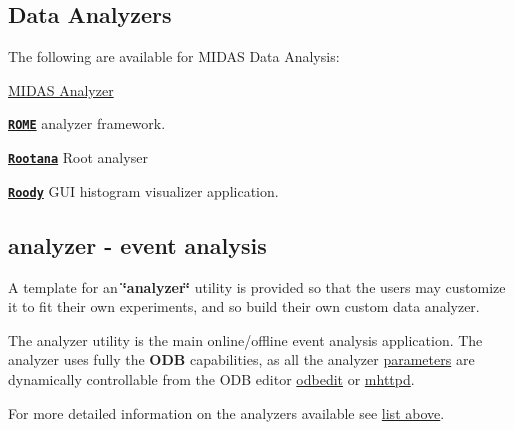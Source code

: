 \par
  \par


\label{DataAnalysis_idx_analyzers}
\hypertarget{DataAnalysis_idx_analyzers}{}
 \label{DataAnalysis_idx_analyzer_documentation_ROME}
\hypertarget{DataAnalysis_idx_analyzer_documentation_ROME}{}
 \label{DataAnalysis_idx_analyzer_documentation_Rootana}
\hypertarget{DataAnalysis_idx_analyzer_documentation_Rootana}{}
 \label{DataAnalysis_idx_analyzer_documentation_Roody}
\hypertarget{DataAnalysis_idx_analyzer_documentation_Roody}{}
\hypertarget{DataAnalysis_DA_Data_analyzers}{}\subsection{Data Analyzers}\label{DataAnalysis_DA_Data_analyzers}
The following are available for MIDAS Data Analysis: 
\begin{DoxyItemize}
\item \hyperlink{DataAnalysis_DA_Midas_Analyzer}{MIDAS Analyzer} 
\item {\bfseries \href{http://midas.psi.ch/rome}{\tt ROME}} analyzer framework. 
\item {\bfseries \href{http://ladd00.triumf.ca/%7Eolchansk/rootana/}{\tt Rootana}} Root analyser 
\item {\bfseries \href{http://ladd00.triumf.ca/~daqweb/doc/roody/html/}{\tt Roody}} GUI histogram visualizer application. 
\end{DoxyItemize}

\label{DataAnalysis_idx_analyzer_utility}
\hypertarget{DataAnalysis_idx_analyzer_utility}{}
 \hypertarget{DataAnalysis_DA_analyzer_utility}{}\subsection{analyzer    -\/ event analysis}\label{DataAnalysis_DA_analyzer_utility}
A template for an {\bfseries \char`\"{}analyzer\char`\"{}} utility is provided so that the users may customize it to fit their own experiments, and so build their own custom data analyzer.

The analyzer utility is the main online/offline event analysis application. The analyzer uses fully the {\bfseries ODB} capabilities, as all the analyzer \hyperlink{structparameters}{parameters} are dynamically controllable from the ODB editor \hyperlink{RC_odbedit_utility}{odbedit} or \hyperlink{RC_mhttpd_utility}{mhttpd}.

For more detailed information on the analyzers available see \hyperlink{DataAnalysis_DA_Data_analyzers}{list above}.


